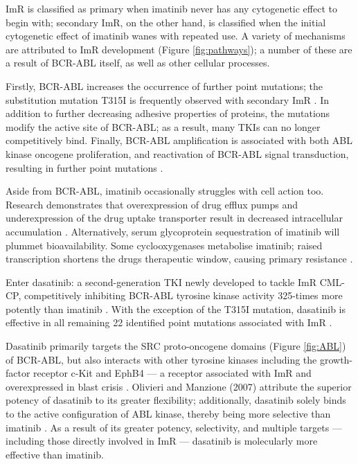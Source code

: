 ImR is classified as primary when imatinib never has any cytogenetic effect to begin with; secondary ImR, on the other hand, is classified when the initial cytogenetic effect of imatinib wanes with repeated use. A variety of mechanisms are attributed to ImR development (Figure \ref{fig:pathways}); a number of these are a result of BCR-ABL itself, as well as other cellular processes.

Firstly, BCR-ABL increases the occurrence of further point mutations; the substitution mutation T315I is frequently observed with secondary ImR  \citep{RefWorks:doc:583b61bae4b066125b215b1c}. In addition to further decreasing adhesive properties of proteins, the mutations modify the active site of BCR-ABL; as a result, many TKIs can no longer competitively bind. Finally, BCR-ABL amplification is associated with both ABL kinase oncogene proliferation, and reactivation of BCR-ABL signal transduction, resulting in further point mutations  \citep{RefWorks:doc:583b61bae4b066125b215b1c}.

Aside from BCR-ABL, imatinib occasionally struggles with cell action too. Research demonstrates that overexpression of drug efflux pumps and underexpression of the drug uptake transporter result in decreased intracellular accumulation  \citep{RefWorks:doc:583b61bae4b066125b215b1c}. Alternatively, serum glycoprotein sequestration of imatinib will plummet bioavailability. Some cyclooxygenases metabolise imatinib; raised transcription shortens the drug\textquotesingle s therapeutic window, causing primary resistance \citep{RefWorks:doc:583b6510e4b09a21e938a599}.

Enter dasatinib: a second-generation TKI newly developed to tackle ImR CML-CP, competitively inhibiting BCR-ABL tyrosine kinase activity 325-times more potently than imatinib \citep{RefWorks:doc:583c13cee4b027b9d41589ed}. With the exception of the T315I mutation, dasatinib is effective in all remaining 22 identified point mutations associated with ImR \citep{RefWorks:doc:583c13cee4b027b9d41589ed}.

Dasatinib primarily targets the SRC proto-oncogene domains (Figure \ref{fig:ABL}) of BCR-ABL, but also interacts with other tyrosine kinases including the growth-factor receptor c-Kit and EphB4 --- a receptor associated with ImR and overexpressed in blast crisis \citep{RefWorks:doc:59ac4236e4b07cfb2e760718,RefWorks:doc:583c13cee4b027b9d41589ed}. Olivieri and Manzione (2007) attribute the superior potency of dasatinib to its greater flexibility; additionally, dasatinib solely binds to the active configuration of ABL kinase, thereby being more selective than imatinib \citep{RefWorks:doc:59ac469ce4b021c5b154adff}. As a result of its greater potency, selectivity, and multiple targets --- including those directly involved in ImR --- dasatinib is molecularly more effective than imatinib.

